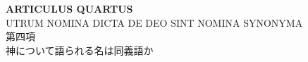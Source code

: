 \documentclass[10pt]{jsarticle} %
\begin{document}
%
%

\newpage
{}

\begin{center}
 {\Large {\bf ARTICULUS QUARTUS}}\\
{\large UTRUM NOMINA DICTA DE DEO SINT NOMINA SYNONYMA\\
第四項\\
神について語られる名は同義語か}
\end{center}
\end{document}
